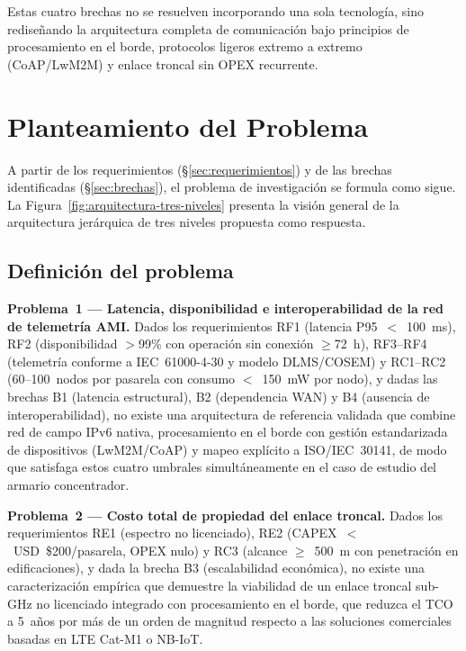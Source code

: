 Estas cuatro brechas no se resuelven incorporando una sola tecnología, sino rediseñando la arquitectura completa de comunicación bajo principios de procesamiento en el borde, protocolos ligeros extremo a extremo (CoAP/LwM2M) y enlace troncal sin OPEX recurrente.


\section{Planteamiento del Problema}
\label{sec:planteamiento-problema}

A partir de los requerimientos (§\ref{sec:requerimientos}) y de las brechas identificadas (§\ref{sec:brechas}), el problema de investigación se formula como sigue. La Figura~\ref{fig:arquitectura-tres-niveles} presenta la visión general de la arquitectura jerárquica de tres niveles propuesta como respuesta.



\subsection{Definición del problema}

\textbf{Problema~1 --- Latencia, disponibilidad e interoperabilidad de la red de telemetría AMI.} Dados los requerimientos RF1 (latencia P95~$<$~100~ms), RF2 (disponibilidad $>$99\% con operación sin conexión $\geq$72~h), RF3--RF4 (telemetría conforme a IEC~61000-4-30 y modelo DLMS/COSEM) y RC1--RC2 (60--100~nodos por pasarela con consumo $<$~150~mW por nodo), y dadas las brechas B1 (latencia estructural), B2 (dependencia WAN) y B4 (ausencia de interoperabilidad), no existe una arquitectura de referencia validada que combine red de campo IPv6 nativa, procesamiento en el borde con gestión estandarizada de dispositivos (LwM2M/CoAP) y mapeo explícito a ISO/IEC~30141, de modo que satisfaga estos cuatro umbrales simultáneamente en el caso de estudio del armario concentrador.

\textbf{Problema~2 --- Costo total de propiedad del enlace troncal.} Dados los requerimientos RE1 (espectro no licenciado), RE2 (CAPEX~$<$~USD~\$200/pasarela, OPEX nulo) y RC3 (alcance $\geq$~500~m con penetración en edificaciones), y dada la brecha B3 (escalabilidad económica), no existe una caracterización empírica que demuestre la viabilidad de un enlace troncal sub-GHz no licenciado integrado con procesamiento en el borde, que reduzca el TCO a 5~años por más de un orden de magnitud respecto a las soluciones comerciales basadas en LTE Cat-M1 o NB-IoT.

